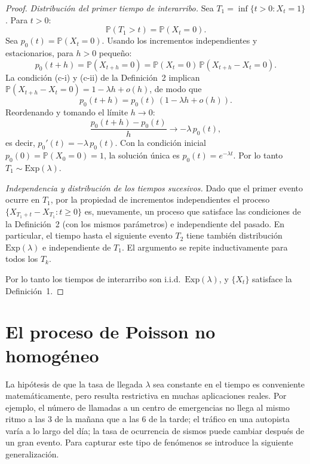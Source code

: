 \documentclass[12pt]{book}
\begin{document}
\begin{proof}
\textit{Distribución del primer tiempo de interarribo.} Sea $T_1 = \inf\{t > 0 : X_t = 1\}$. Para $t > 0$:
\[
    \mathbb{P}(T_1 > t) = \mathbb{P}(X_t = 0).
\]
Sea $p_0(t) = \mathbb{P}(X_t = 0)$. Usando los incrementos independientes y estacionarios, para $h > 0$ pequeño:
\[
    p_0(t+h) = \mathbb{P}(X_{t+h} = 0) = \mathbb{P}(X_t = 0)\,\mathbb{P}(X_{t+h} - X_t = 0).
\]
La condición (c-i) y (c-ii) de la Definición~2 implican $\mathbb{P}(X_{t+h} - X_t = 0) = 1 - \lambda h + o(h)$, de modo que
\[
    p_0(t+h) = p_0(t)\,(1 - \lambda h + o(h)).
\]
Reordenando y tomando el límite $h \to 0$:
\[
    \frac{p_0(t+h) - p_0(t)}{h} \to -\lambda\, p_0(t),
\]
es decir, $p_0'(t) = -\lambda\, p_0(t)$. Con la condición inicial $p_0(0) = \mathbb{P}(X_0 = 0) = 1$, la solución única es $p_0(t) = e^{-\lambda t}$. Por lo tanto $T_1 \sim \mathrm{Exp}(\lambda)$.

\textit{Independencia y distribución de los tiempos sucesivos.} Dado que el primer evento ocurre en $T_1$, por la propiedad de incrementos independientes el proceso $\{X_{T_1 + t} - X_{T_1} : t \ge 0\}$ es, nuevamente, un proceso que satisface las condiciones de la Definición~2 (con los mismos parámetros) e independiente del pasado. En particular, el tiempo hasta el siguiente evento $T_2$ tiene también distribución $\mathrm{Exp}(\lambda)$ e independiente de $T_1$. El argumento se repite inductivamente para todos los $T_k$.

Por lo tanto los tiempos de interarribo son i.i.d.\ $\mathrm{Exp}(\lambda)$, y $\{X_t\}$ satisface la Definición~1.
\end{proof}

\section{El proceso de Poisson no homogéneo}

La hipótesis de que la tasa de llegada $\lambda$ sea constante en el tiempo es conveniente matemáticamente, pero resulta restrictiva en muchas aplicaciones reales. Por ejemplo, el número de llamadas a un centro de emergencias no llega al mismo ritmo a las 3 de la mañana que a las 6 de la tarde; el tráfico en una autopista varía a lo largo del día; la tasa de ocurrencia de sismos puede cambiar después de un gran evento. Para capturar este tipo de fenómenos se introduce la siguiente generalización.
\end{document}
